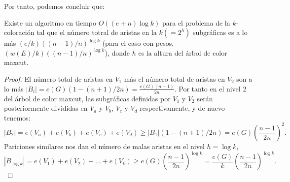\documentclass[letterpaper]{article}
\begin{document}
Por tanto, podemos concluir que:

\begin{theorem}
    Existe un algoritmo en tiempo $O((e+n)\log k)$ para el problema de la $k$-coloración tal que el
    número totral de aristas en la $k(=2^h)$ subgráficas es a lo más
    $(e/k)((n-1)/n)^{\log k}$ (para el caso con pesos, $(w(E)/k)((n-1)/n)^{\log k}$), donde $h$ es la
    altura del árbol de color maxcut.
    \begin{proof}
        El número total de aristas en $V_1$ más el número total de aristas en $V_2$ son a lo más
        $|B_i| = e(G)(1-(n+1)/2n)=\frac{e(G)(n-1)}{2n}$.
        Por tanto en el nivel 2 del árbol de color maxcut, las subgráficas definidas por $V_1$ y $V_2$
        serán posteriormente divididas en $V_a$ y $V_b$, $V_c$ y $V_d$ respectivamente, y de nuevo tenemos:
        \[
            |B_2| = e(V_a) + e(V_b) + e(V_c) + e(V_d) \geq |B_1| (1 - (n+1)/2n) = e(G)(\frac{n-1}{2n})^2.
        \]
        Pariciones similares nos dan el número de malas aristas en el nivel $h = \log k$,
        \[
            |B_{\log k}| = e(V_1) + e(V_2) + \ldots + e(V_k) \geq e(G)(\frac{n-1}{2n})^{\log k} =
            \frac{e(G)}{k}(\frac{n-1}{2n})^{\log k}.
        \]
        
    \end{proof}
\end{theorem}





\nocite{*}




\end{document}
